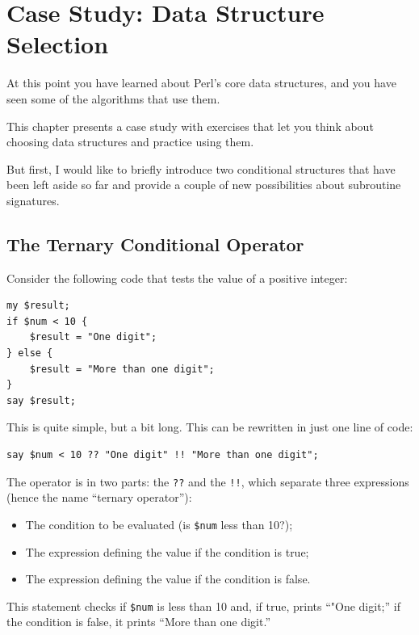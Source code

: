 
\chapter{Case Study: Data Structure Selection}
\label{data_struct_sel}

At this point you have learned about Perl's core data structures,
and you have seen some of the algorithms that use them.

This chapter presents a case study with exercises that let
you think about choosing data structures and practice using them.

But first, I would like to briefly introduce two conditional 
structures that have been left aside so far and provide 
a couple of new possibilities about subroutine signatures. 

\section{The Ternary Conditional Operator}
\label{ternary operator}

Consider the following code that tests the value of a positive 
integer:

\begin{verbatim}
my $result;
if $num < 10 {
    $result = "One digit";
} else {
    $result = "More than one digit";
}
say $result;
\end{verbatim}

This is quite simple, but a bit long. This can be rewritten 
in just one line of code:

\begin{verbatim}
say $num < 10 ?? "One digit" !! "More than one digit";
\end{verbatim}

The operator is in two parts: the {\tt ??} and the {\tt !!}, which 
separate three expressions (hence the name ``ternary operator''): 
\begin{itemize}
\item The condition to be evaluated (is \verb'$num' less than 10?);
\item The expression defining the value if the condition is true;
\item The expression defining the value if the condition is false.
\end{itemize}

This statement checks if \verb'$num' is less than 10 and, if 
true, prints ``"One digit;'' if the 
condition is false, it prints ``More than one digit.''

